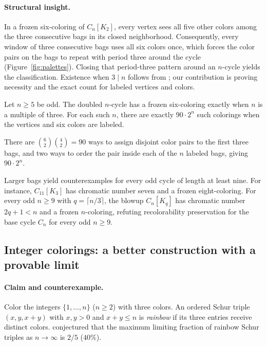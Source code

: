 \paragraph{Structural insight.}
In a frozen six-coloring of $C_n[K_2]$, every vertex sees all five other colors among the three consecutive bags in its closed neighborhood. Consequently, every window of three consecutive bags uses all six colors once, which forces the color pairs on the bags to repeat with period three around the cycle (Figure~\ref{fig:palettes}). Closing that period-three pattern around an $n$-cycle yields the classification. Existence when $3\mid n$ follows from \citet{shaebani2009fall}; our contribution is proving necessity and the exact count for labeled vertices and colors.

\begin{proposition}
\label{prop:cycle-readable}
Let $n\ge5$ be odd. The doubled $n$-cycle has a frozen six-coloring exactly when $n$ is a multiple of three. For each such $n$, there are exactly $90\cdot2^n$ such colorings when the vertices and six colors are labeled.
\end{proposition}
There are $\binom{6}{2}\binom{4}{2}=90$ ways to assign disjoint color pairs to the first three bags, and two ways to order the pair inside each of the $n$ labeled bags, giving $90\cdot2^n$.

Larger bags yield counterexamples for every odd cycle of length at least nine. For instance, $C_{11}[K_3]$ has chromatic number seven and a frozen eight-coloring. For every odd $n\ge9$ with $q=\lceil n/3\rceil$, the blowup $C_n[K_q]$ has chromatic number $2q+1<n$ and a frozen $n$-coloring, refuting recolorability preservation for the base cycle $C_n$ for every odd $n\ge9$.

\subsection{Integer colorings: a better construction with a provable limit}
\paragraph{Claim and counterexample.}
Color the integers $\{1,\dots,n\}$ ($n\ge2$) with three colors. An ordered Schur triple $(x,y,x+y)$ with $x,y>0$ and $x+y\le n$ is \emph{rainbow} if its three entries receive distinct colors. \citet{parczyk2026unschur} conjectured that the maximum limiting fraction of rainbow Schur triples as $n\to\infty$ is $2/5$ ($40\%$).

